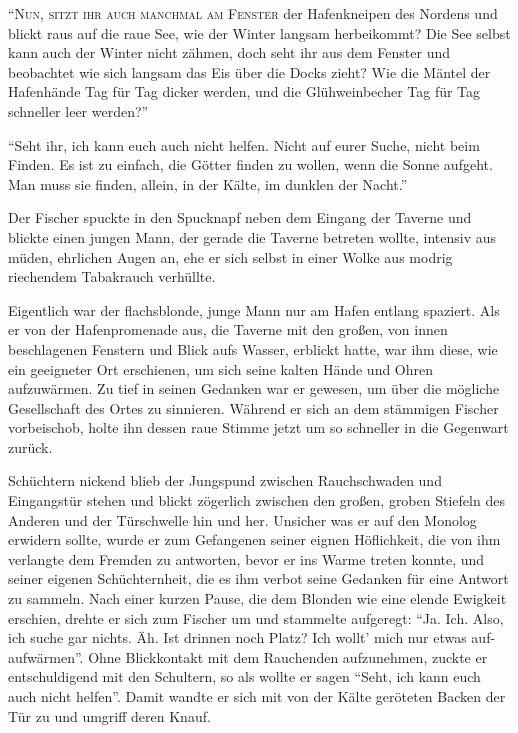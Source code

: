 

\lettrine{``N}{un, sitzt ihr auch manchmal am Fenster} der Hafenkneipen des Nordens und blickt raus auf die raue See, wie der Winter langsam herbeikommt? Die See selbst kann auch der Winter nicht zähmen, doch seht ihr aus dem Fenster und beobachtet wie sich langsam das Eis über die Docks zieht? Wie die Mäntel der Hafenhände Tag für Tag dicker werden, und die Glühweinbecher Tag für Tag schneller leer werden?''

``Seht ihr, ich kann euch auch nicht helfen. Nicht auf eurer Suche, nicht beim Finden. Es ist zu einfach, die Götter finden zu wollen, wenn die Sonne aufgeht. Man muss sie finden, allein, in der Kälte, im dunklen der Nacht.''

Der Fischer spuckte in den Spucknapf neben dem Eingang der Taverne und blickte einen jungen Mann, der gerade die Taverne betreten wollte, intensiv aus müden, ehrlichen Augen an, ehe er sich selbst in einer Wolke aus modrig riechendem Tabakrauch verhüllte.

Eigentlich war der flachsblonde, junge Mann nur am Hafen entlang spaziert. Als er von der Hafenpromenade aus, die Taverne mit den großen, von innen beschlagenen Fenstern und Blick aufs Wasser, erblickt hatte, war ihm diese, wie ein geeigneter Ort erschienen, um sich seine kalten Hände und Ohren aufzuwärmen. Zu tief in seinen Gedanken war er gewesen, um über die mögliche Gesellschaft des Ortes zu sinnieren.
Während er sich an dem stämmigen Fischer vorbeischob, holte ihn dessen raue Stimme jetzt um so schneller in die Gegenwart zurück.

Schüchtern nickend blieb der Jungspund zwischen Rauchschwaden und Eingangstür stehen und blickt zögerlich zwischen den großen, groben Stiefeln des Anderen und der Türschwelle hin und her. Unsicher was er auf den Monolog erwidern sollte, wurde er zum Gefangenen seiner eignen Höflichkeit, die von ihm verlangte dem Fremden zu antworten, bevor er ins Warme treten konnte, und seiner eigenen Schüchternheit, die es ihm verbot seine Gedanken für eine Antwort zu sammeln. Nach einer kurzen Pause, die dem Blonden wie eine elende Ewigkeit erschien, drehte er sich zum Fischer um und stammelte aufgeregt: ``Ja. Ich. Also, ich suche gar nichts. Äh. Ist drinnen noch Platz? Ich wollt' mich nur etwas auf-aufwärmen''. Ohne Blickkontakt mit dem Rauchenden aufzunehmen, zuckte er entschuldigend mit den Schultern, so als wollte er sagen ``Seht, ich kann euch auch nicht helfen''. Damit wandte er sich mit von der Kälte geröteten Backen der Tür zu und umgriff deren Knauf.

